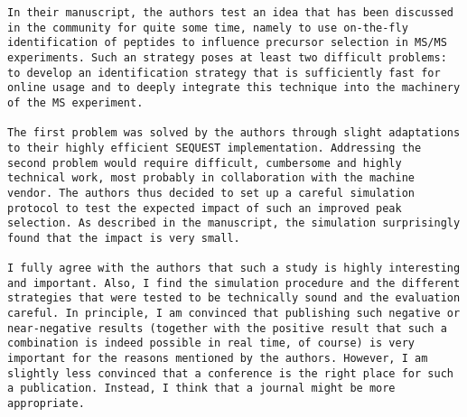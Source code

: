 \documentclass[12pt]{article}
\begin{document}
\begin{verbatim}
In their manuscript, the authors test an idea that has been discussed
in the community for quite some time, namely to use on-the-fly
identification of peptides to influence precursor selection in MS/MS
experiments. Such an strategy poses at least two difficult problems:
to develop an identification strategy that is sufficiently fast for
online usage and to deeply integrate this technique into the machinery
of the MS experiment.

The first problem was solved by the authors through slight adaptations
to their highly efficient SEQUEST implementation. Addressing the
second problem would require difficult, cumbersome and highly
technical work, most probably in collaboration with the machine
vendor. The authors thus decided to set up a careful simulation
protocol to test the expected impact of such an improved peak
selection. As described in the manuscript, the simulation surprisingly
found that the impact is very small.

I fully agree with the authors that such a study is highly interesting
and important. Also, I find the simulation procedure and the different
strategies that were tested to be technically sound and the evaluation
careful. In principle, I am convinced that publishing such negative or
near-negative results (together with the positive result that such a
combination is indeed possible in real time, of course) is very
important for the reasons mentioned by the authors. However, I am
slightly less convinced that a conference is the right place for such
a publication. Instead, I think that a journal might be more
appropriate.
\end{verbatim}
\end{document}
